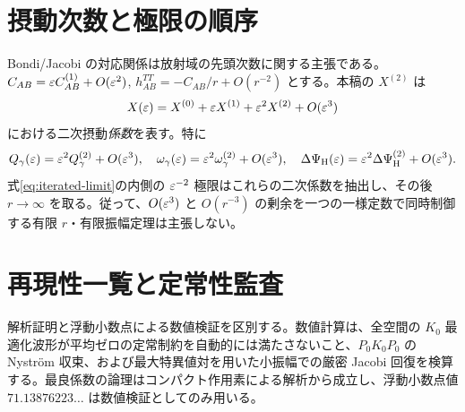 \section{摂動次数と極限の順序}
Bondi/Jacobi の対応関係は放射域の先頭次数に関する主張である。$C_{AB}=\varepsilon C_{AB}^{(1)}+O(\varepsilon^2)$, $h_{AB}^{TT}=-C_{AB}/r+O(r^{-2})$ とする。本稿の $X^{(2)}$ は
\[
X(\varepsilon)=X^{(0)}+\varepsilon X^{(1)}+\varepsilon^2X^{(2)}+O(\varepsilon^3)
\]
における二次摂動\emph{係数}を表す。特に
\[
Q_\gamma(\varepsilon)=\varepsilon^2Q_\gamma^{(2)}+O(\varepsilon^3),\quad
\omega_\gamma(\varepsilon)=\varepsilon^2\omega_\gamma^{(2)}+O(\varepsilon^3),\quad
\Delta\Psi_{\rm H}(\varepsilon)=\varepsilon^2\Delta\Psi_{\rm H}^{(2)}+O(\varepsilon^3).
\]
式\eqref{eq:iterated-limit}の内側の $\varepsilon^{-2}$ 極限はこれらの二次係数を抽出し、その後 $r\to\infty$ を取る。従って、$O(\varepsilon^3)$ と $O(r^{-3})$ の剰余を一つの一様定数で同時制御する有限 $r$・有限振幅定理は主張しない。

\section{再現性一覧と定常性監査}
解析証明と浮動小数点による数値検証を区別する。数値計算は、全空間の $K_0$ 最適化波形が平均ゼロの定常制約を自動的には満たさないこと、$P_0K_0P_0$ の Nystr\"om 収束、および最大特異値対を用いた小振幅での厳密 Jacobi 回復を検算する。最良係数の論理はコンパクト作用素による解析から成立し、浮動小数点値 $71.13876223\ldots$ は数値検証としてのみ用いる。


